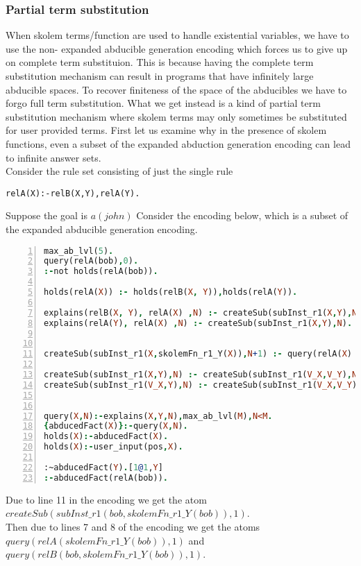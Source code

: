 \documentclass{article}
\begin{document}
\subsubsection{Partial term substitution}
When skolem terms/function are used to handle existential variables, we have to use the non- expanded abducible generation encoding which forces us to give up on complete term substituion.  This is because having the complete term substitution mechanism can result in programs that have infinitely large abducible spaces. To recover finiteness of the space of the abducibles we have to forgo full term substitution. What we get instead is a kind of partial term substitution mechanism where skolem terms may only sometimes be substituted for user provided terms.  First let us examine why in the presence of skolem functions, even a subset of the expanded abduction generation encoding can lead to infinite answer sets.\\
\newline
Consider the rule set consisting of just the single rule \begin{verbatim}
relA(X):-relB(X,Y),relA(Y).
\end{verbatim}
Suppose the goal is $a(john)$
Consider the encoding below, which is a subset of the expanded abducible generation encoding.
\begin{lstlisting}[language=Prolog, numbers=left]
max_ab_lvl(5).
query(relA(bob),0).
:-not holds(relA(bob)).

holds(relA(X)) :- holds(relB(X, Y)),holds(relA(Y)).

explains(relB(X, Y), relA(X) ,N) :- createSub(subInst_r1(X,Y),N).
explains(relA(Y), relA(X) ,N) :- createSub(subInst_r1(X,Y),N).


createSub(subInst_r1(X,skolemFn_r1_Y(X)),N+1) :- query(relA(X) ,N),max_ab_lvl(M),N<M-1.

createSub(subInst_r1(X,Y),N) :- createSub(subInst_r1(V_X,V_Y),N), holds(relB(X, Y)).
createSub(subInst_r1(V_X,Y),N) :- createSub(subInst_r1(V_X,V_Y),N),holds(relA(Y)).


query(X,N):-explains(X,Y,N),max_ab_lvl(M),N<M.
{abducedFact(X)}:-query(X,N).
holds(X):-abducedFact(X).
holds(X):-user_input(pos,X).

:~abducedFact(Y).[1@1,Y]
:-abducedFact(relA(bob)).
\end{lstlisting}

Due to line 11 in the encoding we get the atom $createSub(subInst\_r1(bob,skolemFn\_r1\_Y(bob)),1)$.\\
Then due to lines 7 and 8 of the encoding we get the atoms $query(relA(skolemFn\_r1\_Y(bob)),1)$ and $query(relB(bob,skolemFn\_r1\_Y(bob)),1)$.\\
\end{document}
